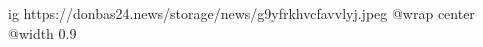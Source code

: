  
 
 
 
 

\ifcmt
  ig https://donbas24.news/storage/news/g9yfrkhvcfavvlyj.jpeg
  @wrap center
  @width 0.9
\fi
